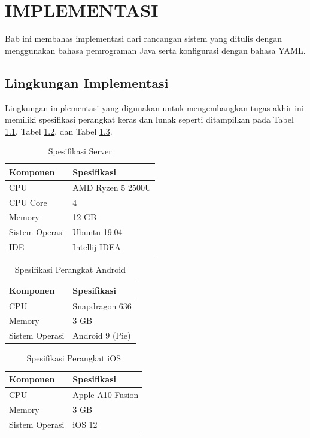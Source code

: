 \chapter {IMPLEMENTASI}
\par Bab ini membahas implementasi dari rancangan sistem yang ditulis dengan menggunakan bahasa pemrograman Java serta konfigurasi dengan bahasa YAML.

\section{Lingkungan Implementasi}
\par Lingkungan implementasi yang digunakan untuk mengembangkan tugas akhir ini memiliki spesifikasi perangkat keras dan lunak seperti ditampilkan pada Tabel \ref{tabel_spesifikasi_server}, Tabel \ref{tabel_spesifikasi_perangkat_android}, dan Tabel \ref{tabel_spesifikasi_perangkat_ios}.
\begin{longtable}{|p{3cm}|p{6.5cm}|}
	\caption{Spesifikasi Server} \label{tabel_spesifikasi_server} \\ \hline
	\rowcolor{lightgray} Komponen & Spesifikasi \\ \hline
	CPU & AMD Ryzen 5 2500U \\ \hline
	CPU Core & 4 \\ \hline
	Memory & 12 GB \\ \hline
	Sistem Operasi & Ubuntu 19.04 \\ \hline
	IDE & Intellij IDEA \\ \hline
\end{longtable}
\begin{longtable}{|p{3cm}|p{6.5cm}|}
	\caption{Spesifikasi Perangkat Android} \label{tabel_spesifikasi_perangkat_android} \\ \hline
	\rowcolor{lightgray} Komponen & Spesifikasi \\ \hline
	CPU & Snapdragon 636 \\ \hline
	Memory & 3 GB \\ \hline
	Sistem Operasi & Android 9 (Pie) \\ \hline
\end{longtable}
\begin{longtable}{|p{3cm}|p{6.5cm}|}
	\caption{Spesifikasi Perangkat iOS} \label{tabel_spesifikasi_perangkat_ios} \\ \hline
	\rowcolor{lightgray} Komponen & Spesifikasi \\ \hline
	CPU & Apple A10 Fusion \\ \hline
	Memory & 3 GB \\ \hline
	Sistem Operasi & iOS 12 \\ \hline
\end{longtable}


